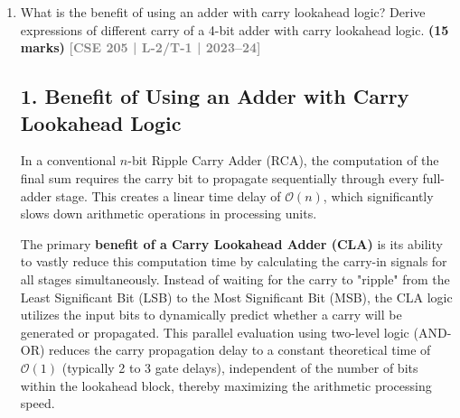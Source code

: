 \documentclass[12pt,a3paper]{article}
\newcommand{\yr}[1]{\hfill\textcolor{gray}{\small\textbf{[#1]}}}
\newcommand{\mk}[1]{\textcolor{orange!70!black}{\small\textbf{(#1 marks)}}}
\begin{document}
\begin{enumerate}
\begin{tcolorbox}[enhanced,breakable,ansbox,colback=cD!4,colframe=cD,boxrule=0.8pt,arc=5pt,title={\textbf{Answer}},fonttitle=\bfseries\color{white},colbacktitle=cD]
The expanded expressions clearly demonstrate that $C_1, C_2, C_3,$ and $C_4$ do not depend on the resolution of immediately preceding carry outputs (for instance, $C_4$ does not have to wait for $C_3$ to be physically calculated by the previous adder block). Instead, they depend entirely on the initial input carry $C_0$ and the external inputs (represented by $P_i$ and $G_i$). 

Because $P_i$ and $G_i$ are generated in parallel with a single gate delay, and the expanded carry expressions form a Sum-of-Products (SOP), the entire Look-Ahead Carry block can be implemented directly using a two-level AND-OR logic circuit. As a result, all intermediate carries are available simultaneously after just a few gate delays, drastically accelerating binary arithmetic operations in modern microprocessors.

\end{tcolorbox}

\item What is the benefit of using an adder with carry lookahead logic? Derive expressions of different carry of a 4-bit adder with carry lookahead logic.
\mk{15} \yr{CSE 205 | L-2/T-1 | 2023--24}

\begin{tcolorbox}[enhanced,breakable,ansbox,colback=cD!4,colframe=cD,boxrule=0.8pt,arc=5pt,title={\textbf{Answer}},fonttitle=\bfseries\color{white},colbacktitle=cD]

\subsection*{1. Benefit of Using an Adder with Carry Lookahead Logic}

In a conventional $n$-bit Ripple Carry Adder (RCA), the computation of the final sum requires the carry bit to propagate sequentially through every full-adder stage. This creates a linear time delay of $\mathcal{O}(n)$, which significantly slows down arithmetic operations in processing units.

The primary \textbf{benefit of a Carry Lookahead Adder (CLA)} is its ability to vastly reduce this computation time by calculating the carry-in signals for all stages simultaneously. Instead of waiting for the carry to "ripple" from the Least Significant Bit (LSB) to the Most Significant Bit (MSB), the CLA logic utilizes the input bits to dynamically predict whether a carry will be generated or propagated. This parallel evaluation using two-level logic (AND-OR) reduces the carry propagation delay to a constant theoretical time of $\mathcal{O}(1)$ (typically 2 to 3 gate delays), independent of the number of bits within the lookahead block, thereby maximizing the arithmetic processing speed.


\end{tcolorbox}
\end{enumerate}
\end{document}
